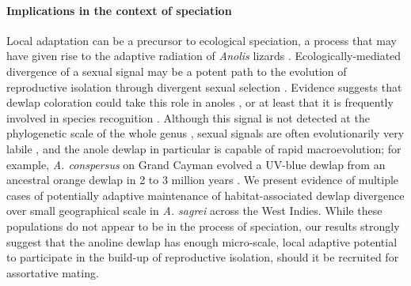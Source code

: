 \paragraph{Implications in the context of speciation} Local adaptation can be a precursor to ecological speciation, a process that may have given rise to the adaptive radiation of \textit{Anolis} lizards \citep{Harmon2003, Gavrilets2009}. Ecologically-mediated divergence of a sexual signal may be a potent path to the evolution of reproductive isolation through divergent sexual selection \citep{Reynolds2007, Servedio2011}. Evidence suggests that dewlap coloration could take this role in anoles \citep{Ng2011, Lambert2013, Geneva2015, Ng2017}, or at least that it is frequently involved in species recognition \citep{Williams1969, Williams1977, Losos1985, Macedonia1994, Fleishman2000, Macedonia2013, Ingram2016, Baeckens2018}. Although this signal is not detected at the phylogenetic scale of the whole genus \citep{Nicholson2007, Harrison2012, Ingram2016}, sexual signals are often evolutionarily very labile \citep{Kraaijeveld2011}, and the anole dewlap in particular is capable of rapid macroevolution; for example, \textit{A. conspersus} on Grand Cayman evolved a UV-blue dewlap from an ancestral orange dewlap in 2 to 3 million years \citep{Macedonia2001}. We present evidence of multiple cases of potentially adaptive maintenance of habitat-associated dewlap divergence over small geographical scale in \textit{A. sagrei} across the West Indies. While these populations do not appear to be in the process of speciation, our results strongly suggest that the anoline dewlap has enough micro-scale, local adaptive potential to participate in the build-up of reproductive isolation, should it be recruited for assortative mating.